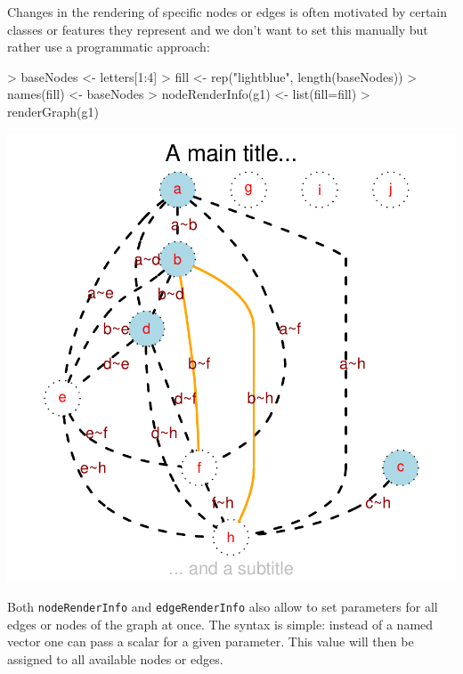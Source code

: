 \documentclass{article}
\newcommand{\Rfunction}[1]{{\texttt{#1}}}
\begin{document}
Changes in the rendering of specific nodes or edges is often motivated
by certain classes or features they represent and we don't want to set
this manually but rather use a programmatic approach:
\begin{Schunk}
\begin{Sinput}
> baseNodes <- letters[1:4]
> fill <- rep("lightblue", length(baseNodes))
> names(fill) <- baseNodes
> nodeRenderInfo(g1) <- list(fill=fill)
> renderGraph(g1)
\end{Sinput}
\end{Schunk}
\includegraphics{newRgraphvizInterface-programParms}

Both \Rfunction{nodeRenderInfo} and
\Rfunction{edgeRenderInfo} also allow to set parameters for all edges
or nodes of the graph at once. The syntax is simple: instead of a
named vector one can pass a scalar for a given parameter. This value
will then be assigned to all available nodes or edges.
\end{document}
